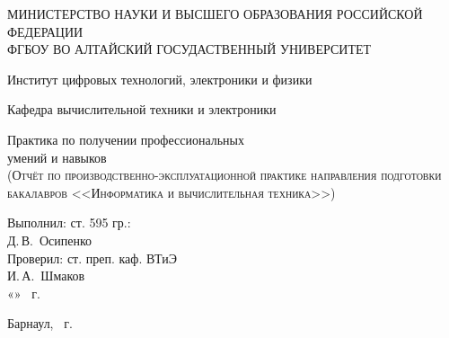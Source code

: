 \documentclass[a4paper, 12pt]{article}
\begin{document}
\begin{titlepage}
  \begin{center}
    \MakeUppercase{Министерство науки и высшего образования Российской Федерации} \\
    \MakeUppercase{ФГБОУ ВО Алтайский госудаственный университет}
    \vspace{0.25cm}
    
	  Институт цифровых технологий, электроники и физики
    
    Кафедра вычислительной техники и электроники
    \vfill
    
    {\LARGE Практика по получении профессиональных\\ умений и навыков}\\[5mm]
    \textsc{(Отчёт по производственно-эксплуатационной практике направления подготовки бакалавров <<Информатика и вычислительная техника>>)}
  \bigskip

\end{center}
\vfill

\newlength{\ML}
\hfill
\begin{minipage}{0.45\textwidth}
  Выполнил: ст. 595 гр.:\\
  \underline{\hspace{\ML}} Д.\,В.~Осипенко\\
  Проверил: ст. преп. каф. ВТиЭ\\
  \underline{\hspace{\ML}} И.\,А.~Шмаков\\
  «\underline{\hspace{0.7cm}}» \underline{\hspace{2cm}} \the\year~г.
\end{minipage}%
\vfill

\begin{center}
  Барнаул, \the\year~г.
\end{center}
\end{titlepage}

\newpage

\tableofcontents 
\newpage
\end{document}
